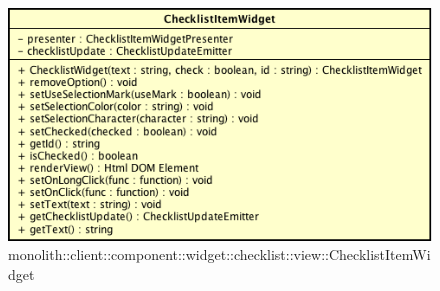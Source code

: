 \label{monolith::client::component::widget::checklist::view::ChecklistItemWidget}
\begin{figure}[H]
	\centering
	\includegraphics[scale=0.5]{Sezioni/SottosezioniST/img/ChecklistItemWidget.png}
	\caption{monolith::client::component::widget::checklist::view::ChecklistItemWidget}
\end{figure}


